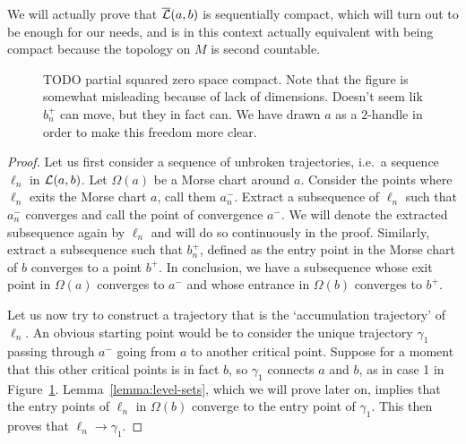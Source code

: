 We will actually prove that $\overline{\mathcal L}(a, b)$ is sequentially compact, which will turn out to be enough for our needs, and is in this context actually equivalent with being compact because the topology on $M$ is second countable.

\begin{figure}[H]
    \centering
    \caption{TODO partial squared zero space compact.
        Note that the figure is somewhat misleading because of lack of dimensions.
        Doesn't seem lik $b_n^{+}$ can move, but they in fact can.
        We have drawn $a$ as a $2$-handle in order to make this freedom more clear.
    }
    \label{fig:partial-squared-zero-space-compact}
\end{figure}



\begin{proof}
    Let us first consider a sequence of unbroken trajectories, i.e.\ a sequence $\ell_n$ in $\mathcal L(a, b)$.
    Let $\Omega(a)$ be a Morse chart around $a$.
    Consider the points where $\ell_n$ exits the Morse chart $a$, call them $a_n^{-}$.
    Extract a subsequence of $\ell_n$ such that $a_{n}^{-}$ converges and call the point of convergence $a^{-}$.
    We will denote the extracted subsequence again by $\ell_n$ and will do so continuously in the proof.
    Similarly, extract a subsequence such that $b_n^{+}$, defined as the entry point in the Morse chart of $b$ converges to a point $b^{+}$.
    In conclusion, we have a subsequence whose exit point in $\Omega(a)$  converges to $a^{-}$ and whose entrance in $\Omega(b)$ converges to  $b^{+}$.

    Let us now try to construct a trajectory that is the `accumulation trajectory' of $\ell_n$.
    An obvious starting point would be to consider the unique trajectory $\gamma_1$ passing through $a^{-}$ going from $a$ to another critical point.
    Suppose for a moment that this other critical points is in fact $b$, so $\gamma_1$ connects  $a$ and  $b$, as in case 1 in Figure~\ref{fig:partial-squared-zero-space-compact}.
    Lemma~\ref{lemma:level-sets}, which we will prove later on, implies that the entry points of $\ell_n$ in $\Omega(b)$ converge to the entry point of $\gamma_1$. This then proves that $\ell_n \to  \gamma_1$.


\end{proof}
